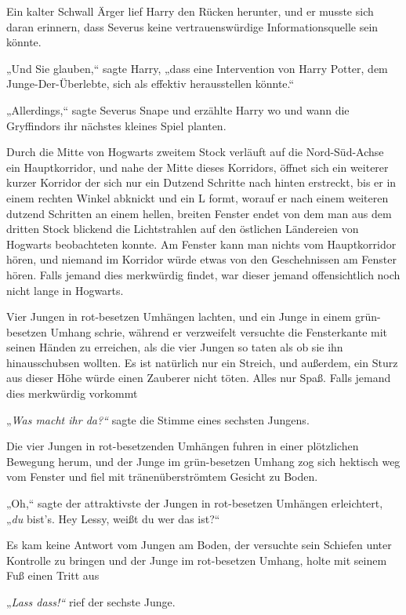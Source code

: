 {Ein kalter Schwall Ärger lief Harry den Rücken herunter, und er musste sich daran erinnern, dass Severus keine vertrauenswürdige Informationsquelle sein könnte.

„Und Sie glauben,“ sagte Harry, „dass eine Intervention von Harry Potter, dem Junge-Der-Überlebte, sich als effektiv herausstellen könnte.“

„Allerdings,“ sagte Severus Snape und erzählte Harry wo und wann die Gryffindors ihr nächstes kleines Spiel planten.

Durch die Mitte von Hogwarts zweitem Stock verläuft auf die Nord-Süd-Achse ein Hauptkorridor, und nahe der Mitte dieses Korridors, öffnet sich ein weiterer kurzer Korridor der sich nur ein Dutzend Schritte nach hinten erstreckt, bis er in einem rechten Winkel abknickt und ein L formt, worauf er nach einem weiteren dutzend Schritten an einem hellen, breiten Fenster endet von dem man aus dem dritten Stock blickend die Lichtstrahlen auf den östlichen Ländereien von Hogwarts beobachteten konnte. Am Fenster kann man nichts vom Hauptkorridor hören, und niemand im Korridor würde etwas von den Geschehnissen am Fenster hören. Falls jemand dies merkwürdig findet, war dieser jemand offensichtlich noch nicht lange in Hogwarts.

Vier Jungen in rot-besetzen Umhängen lachten, und ein Junge in einem grün-besetzen Umhang schrie, während er verzweifelt versuchte die Fensterkante mit seinen Händen zu erreichen, als die vier Jungen so taten als ob sie ihn hinausschubsen wollten. Es ist natürlich nur ein Streich, und außerdem, ein Sturz aus dieser Höhe würde einen Zauberer nicht töten. Alles nur Spaß. Falls jemand dies merkwürdig vorkommt \later

„\emph{Was macht ihr da?“} sagte die Stimme eines sechsten Jungens.

Die vier Jungen in rot-besetzenden Umhängen fuhren in einer plötzlichen Bewegung herum, und der Junge im grün-besetzen Umhang zog sich hektisch weg vom Fenster und fiel mit tränenüberströmtem Gesicht zu Boden.

„Oh,“ sagte der attraktivste der Jungen in rot-besetzen Umhängen erleichtert, „\emph{du} bist's. Hey Lessy, weißt du wer das ist?“

Es kam keine Antwort vom Jungen am Boden, der versuchte sein Schiefen unter Kontrolle zu bringen und der Junge im rot-besetzen Umhang, holte mit seinem Fuß einen Tritt aus \later

„\emph{Lass dass!“} rief der sechste Junge.

}
